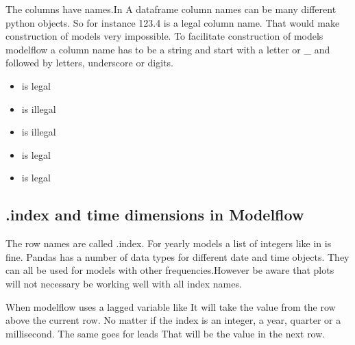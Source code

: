 \documentclass[letterpaper,10pt,english]{jupyterBook}
\begin{document}
\sphinxAtStartPar
The columns have names.In A dataframe column names can be many different python objects. So for instance 123.4  is a legal column name. That would make construction of models very impossible.
To facilitate construction of models modelflow a column name has to be a  string and start with a letter or \_  and followed by letters, underscore or digits.
\begin{itemize}
\item {} 
\sphinxAtStartPar
{} is legal

\item {} 
\sphinxAtStartPar
{} is illegal

\item {} 
\sphinxAtStartPar
{} is illegal

\item {} 
\sphinxAtStartPar
{} is legal

\item {} 
\sphinxAtStartPar
{} is legal

\end{itemize}


\subsection{.index and time dimensions in Modelflow}
\label{\detokenize{content/notebooks/pandas/dataframes:index-and-time-dimensions-in-modelflow}}
\sphinxAtStartPar
The row names are called .index. For yearly models a list of integers like in  is fine.
Pandas has a number of data types for different date and time objects. They can all be used for models with other frequencies.However be aware that plots will not necessary be working well with all index names.

\sphinxAtStartPar
When modelflow uses a lagged variable like  It will take the value from the row above the current row. No matter if the index is an integer, a year, quarter or a millisecond. The same goes for leads   That will be the value in the next row.
\end{document}

